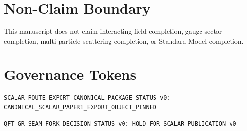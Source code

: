 \documentclass[11pt]{article}
\begin{document}
\section{Non-Claim Boundary}
This manuscript does not claim interacting-field completion, gauge-sector completion, multi-particle scattering completion, or Standard Model completion.

\section{Governance Tokens}
\texttt{SCALAR\_ROUTE\_EXPORT\_CANONICAL\_PACKAGE\_STATUS\_v0: CANONICAL\_SCALAR\_PAPER1\_EXPORT\_OBJECT\_PINNED}

\texttt{QFT\_GR\_SEAM\_FORK\_DECISION\_STATUS\_v0: HOLD\_FOR\_SCALAR\_PUBLICATION\_v0}



\end{document}
